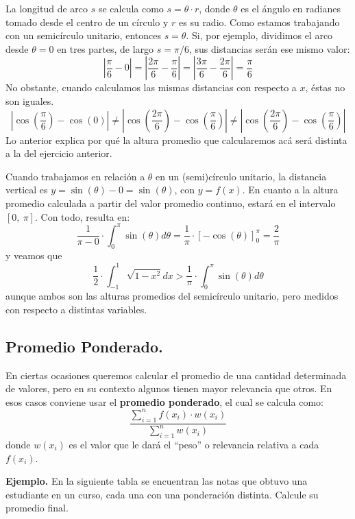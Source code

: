 \documentclass[12pt]{article}
\begin{document}
La longitud de arco $s$ se calcula como $s = \theta \cdot r$, donde $\theta$ es el ángulo en radianes tomado desde el centro de un círculo y $r$ es su radio. Como estamos trabajando con un semicírculo unitario, entonces $s = \theta$. Si, por ejemplo, dividimos el arco desde $\theta = 0$ en tres partes, de largo $s = \pi/6$, sus distancias serán ese mismo valor:
\[
  \left|\frac{\pi}{6} - 0\right| =
  \left|\frac{2\pi}{6} - \frac{\pi}{6}\right| = 
  \left|\frac{3\pi}{6} - \frac{2\pi}{6}\right| = \frac{\pi}{6}
\]
No obstante, cuando calculamos las mismas distancias con respecto a $x$, éstas no son iguales.
\[
  \left|\cos\left(\frac{\pi}{6}\right) - \cos(0)\right| \neq
  \left|\cos\left(\frac{2\pi}{6}\right) - \cos\left(\frac{\pi}{6}\right)\right| \neq
  \left|\cos\left(\frac{2\pi}{6}\right) - \cos\left(\frac{\pi}{6}\right)\right|
\]
Lo anterior explica por qué la altura promedio que calcularemos acá será distinta a la del ejercicio anterior.

Cuando trabajamos en relación a $\theta$ en un (semi)círculo unitario, la distancia vertical es $y = \sin(\theta) - 0 = \sin(\theta)$, con $y = f(x)$. En cuanto a la altura promedio calculada a partir del valor promedio continuo, estará en el intervalo $[0, \ \pi]$. Con todo, resulta en:
\[
  \frac{1}{\pi - 0} \cdot \int_{0}^{\pi} \sin(\theta) d\theta = \frac{1}{\pi} \cdot [-\cos(\theta)]_{0}^{\pi} = \frac{2}{\pi}
\]
y veamos que
\[
  \frac{1}{2} \cdot \int_{-1}^{1} \sqrt{1 - x^{2}}dx  > \frac{1}{\pi} \cdot \int_{0}^{\pi} \sin(\theta) d\theta 
\]
aunque ambos son las alturas promedios del semicírculo unitario, pero medidos con respecto a distintas variables.

\subsection{Promedio Ponderado.}

En ciertas ocasiones queremos calcular el promedio de una cantidad determinada de valores, pero en su contexto algunos tienen mayor relevancia que otros. En esos casos conviene usar el \textbf{promedio ponderado}, el cual se calcula como:
\[
  \frac{\sum_{i = 1}^{n} f(x_{i}) \cdot w(x_{i})}{\sum_{i = 1}^{n} w(x_{i})}
\]
donde $w(x_{i})$ es el valor que le dará el ``peso'' o relevancia relativa a cada $f(x_{i})$.

\textbf{Ejemplo.} En la siguiente tabla se encuentran las notas que obtuvo una estudiante en un curso, cada una con una ponderación distinta. Calcule su promedio final.
\end{document}

